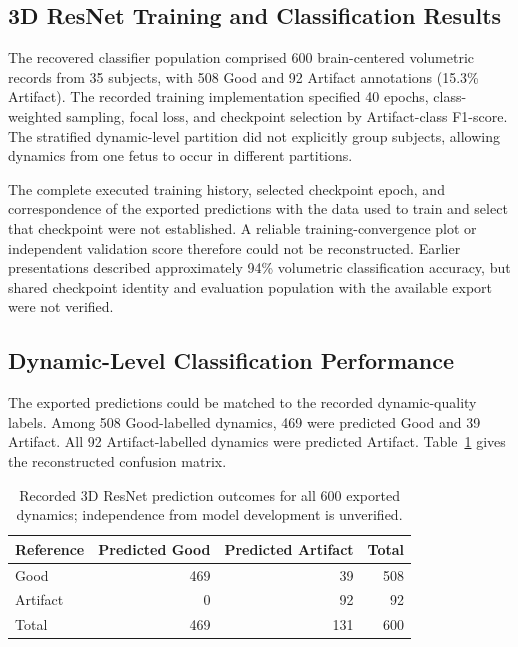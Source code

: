 \subsection{3D ResNet Training and Classification Results}
\label{subsec:results_3d_model_selection}
\label{sec:results_3d_classification}

The recovered classifier population comprised 600 brain-centered volumetric records from 35 subjects, with 508 Good and 92 Artifact annotations (15.3\% Artifact). The recorded training implementation specified 40 epochs, class-weighted sampling, focal loss, and checkpoint selection by Artifact-class F1-score. The stratified dynamic-level partition did not explicitly group subjects, allowing dynamics from one fetus to occur in different partitions.

The complete executed training history, selected checkpoint epoch, and correspondence of the exported predictions with the data used to train and select that checkpoint were not established. A reliable training-convergence plot or independent validation score therefore could not be reconstructed. Earlier presentations described approximately 94\% volumetric classification accuracy, but shared checkpoint identity and evaluation population with the available export were not verified.

\subsection{Dynamic-Level Classification Performance}
\label{subsec:results_3d_classification_metrics}

The exported predictions could be matched to the recorded dynamic-quality labels. Among 508 Good-labelled dynamics, 469 were predicted Good and 39 Artifact. All 92 Artifact-labelled dynamics were predicted Artifact. Table~\ref{tab:3d_resnet_full_export_confusion} gives the reconstructed confusion matrix.

\begin{table}[htbp]
\centering
\caption{Recorded 3D ResNet prediction outcomes for all 600 exported dynamics; independence from model development is unverified.}
\label{tab:3d_resnet_full_export_confusion}
\begin{tabular}{lrrr}
\hline
Reference & Predicted Good & Predicted Artifact & Total \\
\hline
Good & 469 & 39 & 508 \\
Artifact & 0 & 92 & 92 \\
\hline
Total & 469 & 131 & 600 \\
\hline
\end{tabular}
\end{table}

